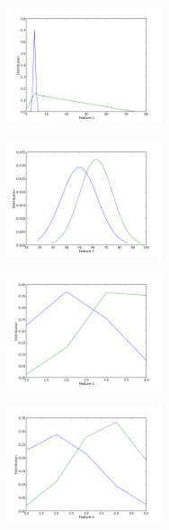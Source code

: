\documentclass[11pt, pdftex]{article}
\begin{document}
\begin{figure}
\begin{subfigure}
  \centering
  \includegraphics[width=0.5\textwidth]{pics/mam1.png}
\end{subfigure}
\begin{subfigure}
  \centering
  \includegraphics[width=0.5\textwidth]{pics/mam2.png}
\end{subfigure}
\begin{subfigure}
  \centering
  \includegraphics[width=0.5\textwidth]{pics/mam3.png}
\end{subfigure}
\begin{subfigure}
  \centering
  \includegraphics[width=0.5\textwidth]{pics/mam4.png}

\end{subfigure}
\end{figure}
\end{document}
